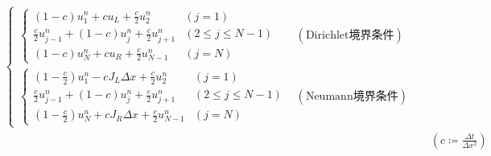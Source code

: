 \documentclass[a4j, titlepage]{jsarticle}
\numberwithin{equation}{section}
\begin{document}
\begin{eqnarray*}
\begin{cases}
\begin{cases}
                    \displaystyle(1 - c)u_1^n + cu_L + \frac{c}{2}u_2^n & (j = 1) \\
                    \displaystyle\frac{c}{2}u_{j - 1}^n + (1 - c)u_j^n + \frac{c}{2}u_{j + 1}^n & (2 \leq j \leq N - 1) \\
                    \displaystyle(1 - c)u_N^n + cu_R + \frac{c}{2}u_{N - 1}^n & (j = N)
                \end{cases} & (\mathrm{Dirichlet}境界条件) \\
                \begin{cases}
                    \displaystyle(1 - \frac{c}{2})u_1^n - cJ_L\Delta x + \frac{c}{2}u_2^n & (j = 1) \\
                    \displaystyle\frac{c}{2}u_{j - 1}^n + (1 - c)u_j^n + \frac{c}{2}u_{j + 1}^n & (2 \leq j \leq N - 1) \\
                    \displaystyle(1 - \frac{c}{2})u_N^n + cJ_R\Delta x + \frac{c}{2}u_{N - 1}^n & (j = N)
                \end{cases} & (\mathrm{Neumann}境界条件)
            \end{cases} \\
            && \left(c \coloneqq \frac{\Delta t}{\Delta x^2}\right)
        \end{eqnarray*}
\end{document}
